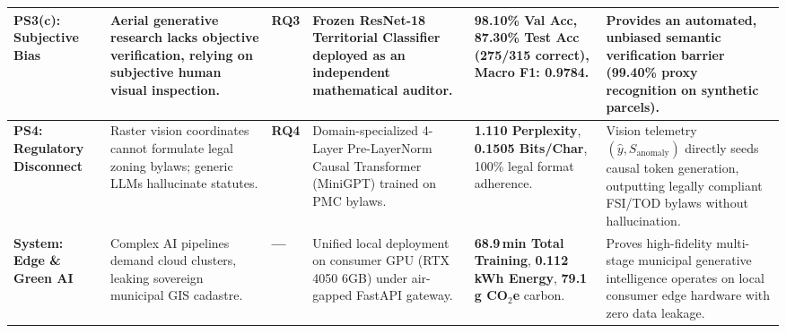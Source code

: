 \documentclass[journal]{IEEEtran}
\begin{document}
\begin{table}[!t]
\begin{tabularx}{\textwidth}{@{}l p{2.8cm} l p{3.2cm} p{3.0cm} p{3.8cm}@{}}
\midrule
\textbf{PS3(c): Subjective Bias} & Aerial generative research lacks objective verification, relying on subjective human visual inspection. & \textbf{RQ3} & Frozen ResNet-18 Territorial Classifier deployed as an independent mathematical auditor. & \textbf{98.10\% Val Acc}, \textbf{87.30\% Test Acc} (275/315 correct), Macro F1: \textbf{0.9784}. & Provides an automated, unbiased semantic verification barrier (99.40\% proxy recognition on synthetic parcels). \\
\midrule
\textbf{PS4: Regulatory Disconnect} & Raster vision coordinates cannot formulate legal zoning bylaws; generic LLMs hallucinate statutes. & \textbf{RQ4} & Domain-specialized 4-Layer Pre-LayerNorm Causal Transformer (MiniGPT) trained on PMC bylaws. & \textbf{1.110 Perplexity}, \textbf{0.1505 Bits/Char}, 100\% legal format adherence. & Vision telemetry $(\hat{y}, S_{\text{anomaly}})$ directly seeds causal token generation, outputting legally compliant FSI/TOD bylaws without hallucination. \\
\midrule
\textbf{System: Edge \& Green AI} & Complex AI pipelines demand cloud clusters, leaking sovereign municipal GIS cadastre. & \textbf{---} & Unified local deployment on consumer GPU (RTX 4050 6GB) under air-gapped FastAPI gateway. & \textbf{68.9\,min Total Training}, \textbf{0.112\,kWh Energy}, \textbf{79.1\,g CO$_2$e} carbon. & Proves high-fidelity multi-stage municipal generative intelligence operates on local consumer edge hardware with zero data leakage. \\
\bottomrule
\end{tabularx}
\end{table}
\end{document}
